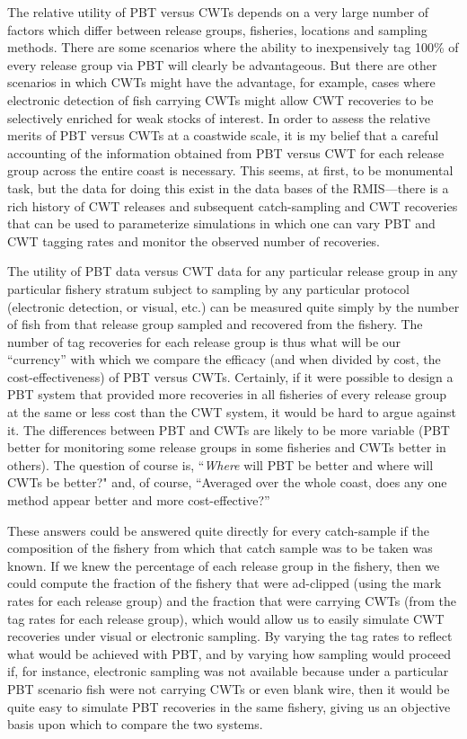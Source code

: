 \documentclass[11pt]{article}
\begin{document}
The relative utility of PBT versus CWTs depends on a very large
number of factors which differ between release groups, fisheries, locations and sampling methods.
There are some scenarios where the ability to inexpensively tag 100\% of every release group via PBT
will clearly be advantageous. But there are other scenarios in which CWTs might have the advantage, for example,
cases where electronic detection of fish carrying CWTs
might allow CWT recoveries to be selectively enriched for weak stocks of interest.  In order to assess the relative merits of PBT versus CWTs at a coastwide
scale, it is my belief that a careful accounting of the information obtained from PBT versus
CWT for each release group across the entire coast is necessary.  This seems, at first, to be  monumental
task, but the data for doing this exist in the data bases of the RMIS---there is a rich history of
CWT releases and subsequent catch-sampling and CWT recoveries that can be used to parameterize simulations
in which one can vary PBT and CWT tagging rates and monitor the observed number of recoveries.



The utility of PBT data versus CWT data for any particular release group in any 
particular fishery stratum subject to sampling by any particular protocol (electronic detection, or 
visual, etc.) can be measured quite simply by the number of fish from that release group sampled and
recovered from the fishery.  The number of tag recoveries for each release group is thus what
will be our ``currency'' with which we compare the efficacy (and when divided by cost, the cost-effectiveness)
of PBT versus CWTs.  Certainly, if it were possible to design a PBT system that provided more recoveries
in all fisheries of every release group at the same or less cost than the CWT system, it would be
hard to argue against it.  The differences between PBT and CWTs are likely to be more variable (PBT better
for monitoring some release groups in some fisheries and CWTs better in others). The question of course is,
``{\em Where} will PBT be better and where will CWTs be better?" and, of course, ``Averaged over the whole
coast, does any one method appear better and more cost-effective?''


These answers could be answered quite directly for every catch-sample if the composition of the
fishery from which that catch sample was to be taken was known.  If we knew the percentage of each
release group in the fishery, then we could compute the fraction of the fishery that were ad-clipped
(using the mark rates for each release group) and the fraction that were carrying CWTs (from the
tag rates for each release group), which would allow us to easily simulate CWT recoveries under
visual or electronic sampling.  By varying the tag rates to reflect what would be achieved with
PBT, and by varying how sampling would proceed if, for instance, electronic sampling was not available because
under a particular PBT scenario fish were not carrying CWTs or even blank wire, then it would be
quite easy to simulate PBT recoveries in the same fishery, giving us an objective basis upon which
to compare the two systems.  
\end{document}
